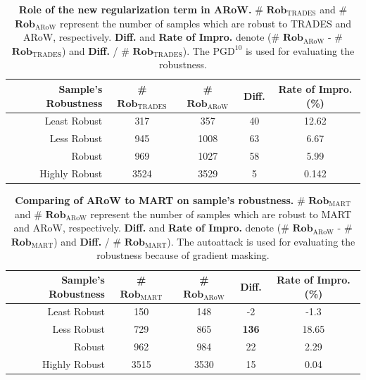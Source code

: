 \documentclass[nohyperref]{article}
\theoremstyle{plain}
\theoremstyle{definition}
\theoremstyle{remark}
\begin{document}
 \begin{table}[ht]
    \caption{\textbf{Role of the new regularization term in ARoW.} \# $\textbf{Rob}_{\text{TRADES}}$ and \# $\textbf{Rob}_{\text{ARoW}}$ represent the number of samples which are robust to TRADES and ARoW, respectively. \textbf{Diff.} and \textbf{Rate of Impro.} denote (\# $\textbf{Rob}_{\text{ARoW}}$ - \# $\textbf{Rob}_{\text{TRADES}}$) and \textbf{Diff.} / \# $\textbf{Rob}_{\text{TRADES}}$). The $\text{PGD}^{10}$ is used for evaluating the robustness.}
    \centering
    \begin{tabular}{r|cccc}
    \hline
    Sample's Robustness & \# $ \textbf{Rob}_{\text{TRADES}}$ & \# $\textbf{Rob}_{\text{ARoW}}$ & \textbf{Diff.} & \textbf{Rate of Impro. (\%) } \\
    \hline
    \hline
    Least Robust  & 317  & 357  & 40 & 12.62 \\
    Less Robust   & 945  & 1008 & 63 & 6.67 \\
    Robust             & 969  & 1027 & 58 & 5.99 \\
    Highly Robust      & 3524 & 3529 & 5 & 0.142\\
    \hline
    \end{tabular}
    \label{effect-regularization-trades}
    \vskip -0.1in
\end{table}
 \begin{table}
    \caption{\textbf{Comparing of ARoW to MART on sample's robustness.} \# $\textbf{Rob}_{\text{MART}}$ and \# $\textbf{Rob}_{\text{ARoW}}$ represent the number of samples which are robust to MART and ARoW, respectively. \textbf{Diff.} and \textbf{Rate of Impro.} denote (\# $\textbf{Rob}_{\text{ARoW}}$ - \# $\textbf{Rob}_{\text{MART}}$) and \textbf{Diff.} / \# $\textbf{Rob}_{\text{MART}}$). The autoattack is used for evaluating the robustness because of gradient masking.}
    \centering
    \begin{tabular}{r|cccc}
    \hline
    Sample's Robustness & \# $ \textbf{Rob}_{\text{MART}}$ & \# $\textbf{Rob}_{\text{ARoW}}$ & \textbf{Diff.} & \textbf{Rate of Impro. (\%) } \\
    \hline
    \hline
    Least Robust  & 150  & 148 & -2 & -1.3 \\
    Less Robust   & 729  & 865 & \textbf{136} & 18.65 \\
    Robust             & 962  & 984 & 22 & 2.29 \\
    Highly Robust      & 3515 & 3530 & 15 & 0.04\\
    \hline
    \end{tabular}
    \label{effect-regularization-mart}
    \vskip -0.1in
\end{table}
\end{document}
